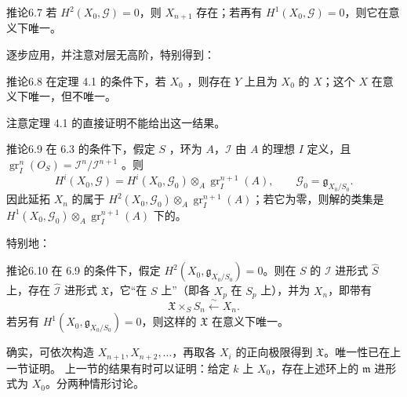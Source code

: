 \begin{SGAresult}{推论}{6.7}
若 $H^2(X_0,\mathcal G)=0$，则 $X_{n+1}$ 存在；若再有 $H^1(X_0,\mathcal G)=0$，则它在意义下唯一。
\end{SGAresult}
逐步应用，并注意对层无高阶，特别得到：
\begin{SGAresult}{推论}{6.8}
在定理 4.1 的条件下，若 $X_0$ ，则存在 $Y$ 上且为 $X_0$ 的 $X$；这个 $X$ 在意义下唯一，但不唯一。
\end{SGAresult}
注意定理 4.1 的直接证明不能给出这一结果。
\begin{SGAresult}{推论}{6.9}
在 6.3 的条件下，假定 $S$ ，环为 $A$，$\mathcal I$ 由 $A$ 的理想 $I$ 定义，且 $\operatorname{gr}^n_I(O_S)=\mathcal I^n/\mathcal I^{n+1}$ 。则
\[H^i(X_0,\mathcal G)=H^i(X_0,\mathcal G_0)\otimes_A\operatorname{gr}^{n+1}_I(A),\qquad\mathcal G_0=\mathfrak g_{X_0/S_0}.\]
因此延拓 $X_n$ 的属于 $H^2(X_0,\mathcal G_0)\otimes_A\operatorname{gr}^{n+1}_I(A)$；若它为零，则解的类集是 $H^1(X_0,\mathcal G_0)\otimes_A\operatorname{gr}^{n+1}_I(A)$ 下的。
\end{SGAresult}
特别地：
\begin{SGAresult}{推论}{6.10}
在 6.9 的条件下，假定 $H^2(X_0,\mathfrak g_{X_0/S_0})=0$。则在 $S$ 的 $\mathcal I$ 进形式 $\widehat S$ 上，存在 $\widehat{\mathcal I}$ 进形式 $\mathfrak X$，它“在 $S$ 上”（即各 $X_p$ 在 $S_p$ 上），并为 $X_n$，即带有
\[\mathfrak X\times_S S_n\xleftarrow{\sim}X_n.\]
若另有 $H^1(X_0,\mathfrak g_{X_0/S_0})=0$，则这样的 $\mathfrak X$ 在意义下唯一。
\end{SGAresult}
确实，可依次构造 $X_{n+1},X_{n+2},\ldots$，再取各 $X_i$ 的正向极限得到 $\mathfrak X$。唯一性已在上一节证明。
上一节的结果有时可以证明：给定 $k$ 上 $X_0$，存在上述环上的 $\mathfrak m$ 进形式为 $X_0$。分两种情形讨论。
